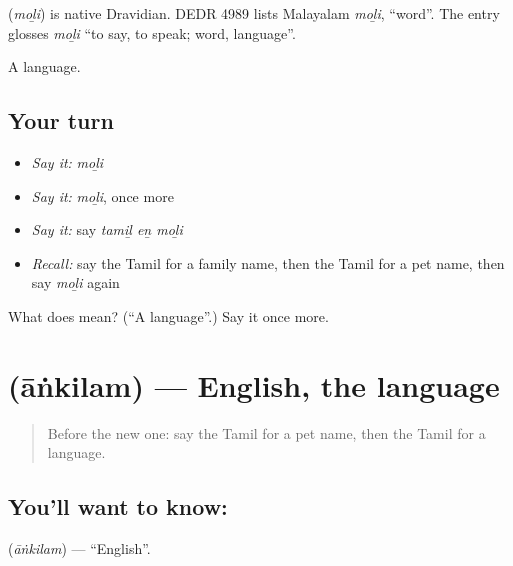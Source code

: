\begin{cousinweb}
\textbf{} (\emph{moḻi}) is native Dravidian. DEDR 4989 lists Malayalam \emph{moḻi}, \textquotedblleft{}word\textquotedblright{}. The entry glosses \emph{moḻi} \textquotedblleft{}to say, to speak; word, language\textquotedblright{}.
\end{cousinweb}

\begin{grammarlens}[title={What you've built}]
A language.
\end{grammarlens}

\subsection*{Your turn}
\begin{itemize}
\raggedright
  \item \emph{Say it:} \emph{moḻi}
  \item \emph{Say it:} \emph{moḻi}, once more
  \item \emph{Say it:} say \emph{tamiḻ eṉ moḻi}
  \item \emph{Recall:} say the Tamil for a family name, then the Tamil for a pet name, then say \emph{moḻi} again
\end{itemize}

\begin{tcolorbox}[breakable,colback=teal!4,colframe=teal!35!black,title={Before you move on}]
What does  mean? (\textquotedblleft{}A language\textquotedblright{}.) Say it once more.
\end{tcolorbox}
\section[\texorpdfstring{\ta{ஆங்கிலம்} (āṅkilam)}{ஆங்கிலம் (āṅkilam)}]{ (āṅkilam) — English, the language}

\label{lesson:TA-C104-english}



\begin{quote}
Before the new one: say the Tamil for a pet name, then the Tamil for a language.
\end{quote}

\subsection*{You'll want to know: }
\textbf{} (\emph{āṅkilam}) — \textquotedblleft{}English\textquotedblright{}.

